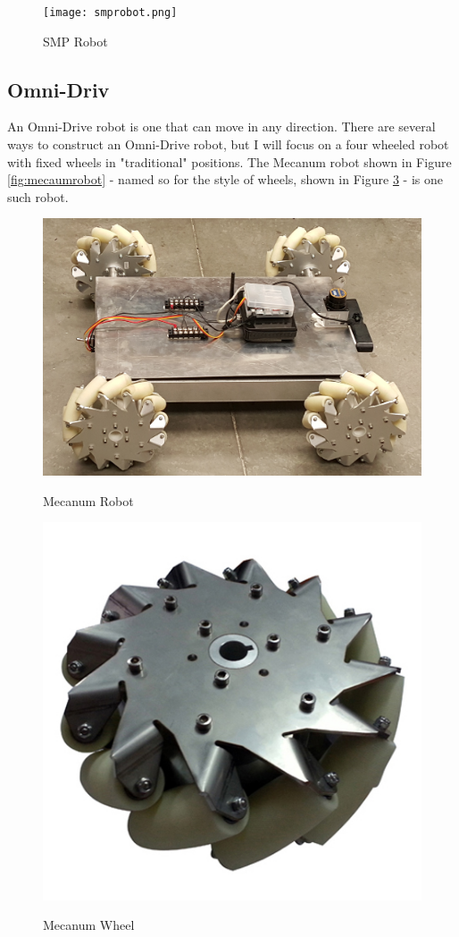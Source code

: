 \begin{figure}[h]
\centering
\texttt{[image: smprobot.png]}
\label{fig:smprobot}
\caption{SMP Robot}
\end{figure} 

\subsection{Omni-Driv}

An Omni-Drive robot is one that can move in any direction. There are several ways to construct an Omni-Drive robot, but I will focus on a four wheeled robot with fixed wheels in "traditional" positions. The Mecanum robot shown in Figure \ref{fig:mecaumrobot} - named so for the style of wheels, shown in Figure \ref{fig:mecanumwheels} - is one such robot.

\begin{figure}[h]
\centering
\includegraphics[scale=0.25]{mecanumrobot.png}
\label{fig:mecanumrobot}
\caption{Mecanum Robot}
\end{figure} 

\begin{figure}[h]
\centering
\includegraphics[scale=0.35]{mecanumwheels.png}
\label{fig:mecanumwheels}
\caption{Mecanum Wheel}
\end{figure} 

